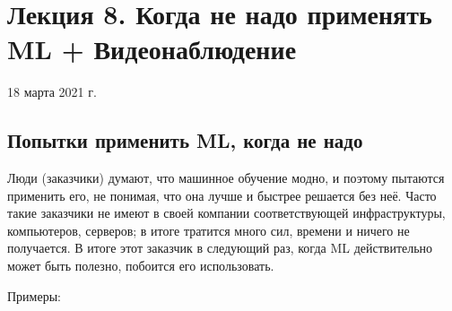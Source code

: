 \documentclass[main.tex]{subfiles}
\begin{document}
\section{Лекция 8. Когда не надо применять ML + Видеонаблюдение}
18 марта 2021 г.

\subsection{Попытки применить ML, когда не надо}

Люди (заказчики) думают, что машинное обучение модно, и поэтому пытаются применить его, не понимая, что она лучше и быстрее решается без неё.
Часто такие заказчики не имеют в своей компании соответствующей инфраструктуры, компьютеров, серверов; в итоге тратится много сил, времени и ничего не получается.
В итоге этот заказчик в следующий раз, когда ML действительно может быть полезно, побоится его использовать.

Примеры:
\end{document}
